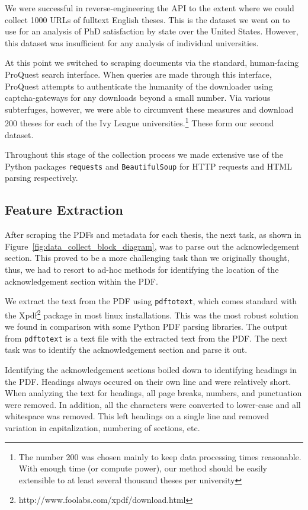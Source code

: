 We were successful in reverse-engineering the API to the extent where we could collect 1000 URLs of fulltext English theses. This is the dataset we went on to use for an analysis of PhD satisfaction by state over the United States. However, this dataset was insufficient for any analysis of individual universities.

At this point we switched to scraping documents via the standard, human-facing ProQuest search interface. When queries are made through this interface, ProQuest attempts to authenticate the humanity of the downloader using captcha-gateways for any downloads beyond a small number. Via various subterfuges, however, we were able to circumvent these measures and download 200 theses for each of the Ivy League universities.\footnote{The number 200 was chosen mainly to keep data processing times reasonable. With enough time (or compute power), our method should be easily extensible to at least several thousand theses per university} These form our second dataset.

Throughout this stage of the collection process we made extensive use of the Python packages \texttt{requests} and \texttt{BeautifulSoup} for HTTP requests and HTML parsing respectively.

\subsection*{Feature Extraction}

After scraping the PDFs and metadata for each thesis, the next task, as shown in Figure~\ref{fig:data_collect_block_diagram}, was to parse out the acknowledgement section.  This proved to be a more challenging task than we originally thought, thus, we had to resort to ad-hoc methods for identifying the location of the acknowledgement section within the PDF.

We extract the text from the PDF using \texttt{pdftotext}, which comes standard with the Xpdf\footnote{http://www.foolabs.com/xpdf/download.html} package in most linux installations.  This was the most robust solution we found in comparison with some Python PDF parsing libraries.  The output from \texttt{pdftotext} is a text file with the extracted text from the PDF.  The next task was to identify the acknowledgement section and parse it out.

Identifying the acknowledgement sections boiled down to identifying headings in the PDF.  Headings always occured on their own line and were relatively short.  When analyzing the text for headings, all page breaks, numbers, and punctuation were removed.  In addition, all the characters were converted to lower-case and all whitespace was removed.  This left headings on a single line and removed variation in capitalization, numbering of sections, etc.  

